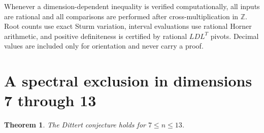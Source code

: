 \documentclass[11pt]{amsart}
\newtheorem{theorem}{Theorem}[section]
\theoremstyle{definition}
\theoremstyle{remark}
\begin{document}
Whenever a dimension-dependent inequality is verified computationally, all
inputs are rational and all comparisons are performed after
cross-multiplication in \(\mathbb Z\).  Root counts use exact Sturm
variation, interval evaluations use rational Horner arithmetic, and
positive definiteness is certified by rational \(LDL^T\) pivots.  Decimal
values are included only for orientation and never carry a proof.

\section{A spectral exclusion in dimensions 7 through 13}\label{sec:spectral}

\begin{theorem}\label{thm:dittert-7-13}
The Dittert conjecture holds for \(7\leq n\leq13\).
\end{theorem}
\end{document}
